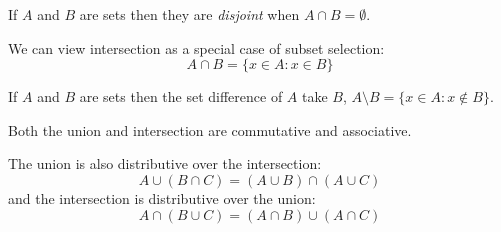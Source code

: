 \documentclass[../main.tex]{subfiles}
\begin{document}
\begin{definition}[Disjoint]
  If $A$ and $B$ are sets then they are \textit{disjoint} when $A \cap B = \emptyset$.
\end{definition}
\begin{remark}[Remark]
  We can view intersection as a special case of subset selection:
  \[
    A \cap B = \{x \in A : x \in B\}
  \]
\end{remark}
\begin{definition}
  If $A$ and $B$ are sets then the set difference of $A$ take $B$, $A \setminus B = \{x \in A: x \notin B\}$. 
\end{definition}
\begin{remark}[Note]
  Both the union and intersection are commutative and associative.

  The union is also distributive over the intersection:
  \[
    A \cup (B \cap C) = (A \cup B) \cap (A \cup C)
  \]
  and the intersection is distributive over the union:
  \[
    A \cap (B \cup C) = (A \cap B) \cup (A \cap C)
  \]
\end{remark}
\end{document}
